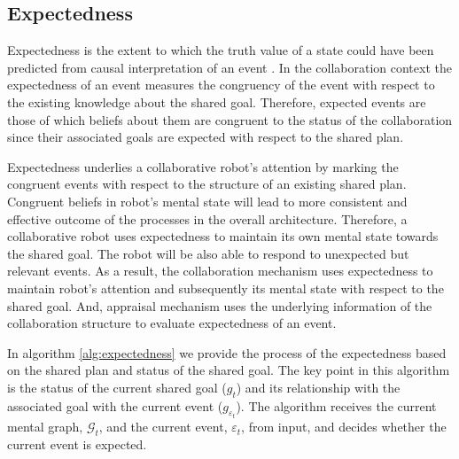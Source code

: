 \documentclass[letterpaper]{article}
\begin{document}
\subsection{Expectedness}

Expectedness is the extent to which the truth value of a state could have been
predicted from causal interpretation of an event
\cite{marsella:ema-process-model}. In the collaboration context the expectedness
of an event measures the congruency of the event with respect to the existing
knowledge about the shared goal. Therefore, expected events are those of which
beliefs about them are congruent to the status of the collaboration since their
associated goals are expected with respect to the shared plan.

Expectedness underlies a collaborative robot's attention by marking the
congruent events with respect to the structure of an existing shared plan.
Congruent beliefs in robot's mental state will lead to more consistent and
effective outcome of the processes in the overall architecture. Therefore,
a collaborative robot uses expectedness to maintain its own mental state towards
the shared goal. The robot will be also able to respond to unexpected but
relevant events. As a result, the collaboration mechanism uses expectedness to
maintain robot's attention and subsequently its mental state with respect to the
shared goal. And, appraisal mechanism uses the underlying information of the
collaboration structure to evaluate expectedness of an event.

In algorithm \ref{alg:expectedness} we provide the process of the expectedness
based on the shared plan and status of the shared goal. The key point in this
algorithm is the status of the current shared goal ($\mathit{g}_{t}$) and its
relationship with the associated goal with the current event 
($\mathit{g}_{\varepsilon_t}$).  The algorithm receives the current mental
graph, $\mathcal{G}_{t}$, and the current event, $\varepsilon_t$, from input,
and decides whether the current event is expected. 
\end{document}
